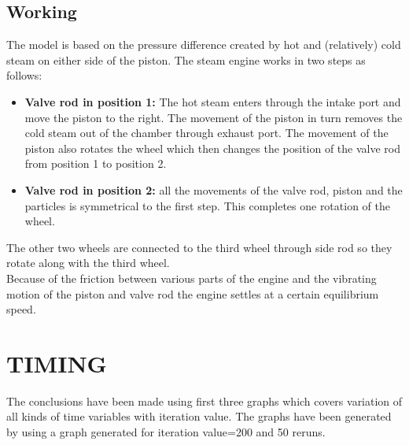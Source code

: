 \documentclass[11pt]{article}
\begin{document}
\subsection{Working}
The model is based on the pressure difference created by hot and (relatively) cold steam on either side of the piston. The steam engine works in two steps as follows\cite{wiki}:
\begin{itemize}
\item \textbf{Valve rod in position 1: } The hot steam enters through the intake port and move the piston to the right. The movement of the piston in turn removes the cold steam out of the chamber through exhaust port. The movement of the piston also rotates the wheel which then changes the position of the valve rod from position 1 to position 2.
\item \textbf{Valve rod in position 2: } all the movements of the valve rod, piston and the particles is symmetrical to the first step. This completes one rotation of the wheel.
\end{itemize}
The other two wheels are connected to the third wheel through side rod so they rotate along with the third wheel.\\
Because of the friction between various parts of the engine and the vibrating motion of the piston and valve rod the engine settles at a certain equilibrium speed.

\section{TIMING}
The conclusions have been made using first three graphs which covers variation of all kinds of time variables with iteration value.
The graphs have been generated by using a graph generated for iteration value=200 and 50 reruns.
\end{document}

